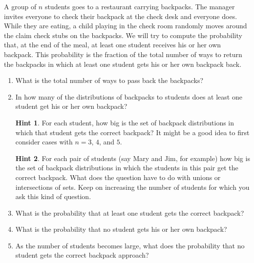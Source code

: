 \documentclass{book}
\begin{document}
\setcounter{cpjt}{222}
\addtocounter{cpjt}{-1}
\begin{activity}\label{hatcheck}
\hypertarget{p-1183}{}%
A group of \(n\) students goes to a restaurant carrying backpacks. The manager invites everyone to check their backpack at the check desk and everyone does. While they are eating, a child playing in the check room randomly moves around the claim check stubs on the backpacks. We will try to compute the probability that, at the end of the meal, at least one student receives his or her own backpack.  This probability is the fraction of the total number of ways to return the backpacks in which at least one student gets his or her own backpack back.%
\begin{enumerate}[font=\bfseries,label=(\alph*),ref=\alph*]
\item\label{task-225} \hypertarget{p-1184}{}%
What is the total number of ways to pass back the backpacks?%
\par\smallskip%
\noindent\item\label{task-226} \hypertarget{p-1186}{}%
In how many of the distributions of backpacks to students does at least one student get his or her own backpack?%
\par\smallskip%
\noindent\textbf{Hint 1}.\hypertarget{hint-141}{}\quad%
\hypertarget{p-1187}{}%
For each student, how big is the set of backpack distributions in which that student gets the correct backpack?  It might be a good idea to first consider cases with \(n=3\), \(4\), and \(5\).%
\par\smallskip%
\noindent\textbf{Hint 2}.\hypertarget{hint-142}{}\quad%
\hypertarget{p-1188}{}%
For each pair of students (say Mary and Jim, for example) how big is the set of backpack distributions in which the students in this pair get the correct backpack. What does the question have to do with unions or intersections of sets. Keep on increasing the number of students for which you ask this kind of question.%
\par\smallskip%
\noindent\item\label{task-227} \hypertarget{p-1190}{}%
What is the probability that at least one student gets the correct backpack?%
\par\smallskip%
\noindent\item\label{hatcheckprobpart} \hypertarget{p-1192}{}%
What is the probability that no student gets his or her own backpack?%
\par\smallskip%
\noindent\item\label{task-229} \hypertarget{p-1194}{}%
As the number of students becomes large, what does the probability that no student gets the correct backpack approach?%
\par\smallskip%
\noindent\end{enumerate}
\end{activity}

\clearpage
\end{document}
